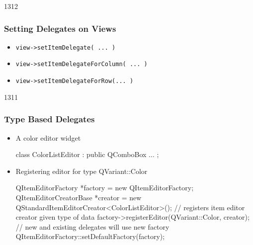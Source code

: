 \begin{slide}{1312}
  \frametitle{Setting Delegates on Views}
  \begin{itemize}
  \item \texttt{view->setItemDelegate( ... )}
  \item \texttt{view->setItemDelegateForColumn( ... )}
  \item \texttt{view->setItemDelegateForRow(... )}
 \end{itemize}
\end{slide}

\begin{slide}[fragile]{1311}
  \frametitle{Type Based Delegates}
\begin{itemize}
\item A color editor widget
\begin{cpp}
class ColorListEditor : public QComboBox {
 ...
}; 
\end{cpp}
\medskip
\item Registering editor for type QVariant::Color
\begin{cpp}
QItemEditorFactory *factory = new QItemEditorFactory;
QItemEditorCreatorBase *creator = 
        new QStandardItemEditorCreator<ColorListEditor>();
// registers item editor creator given type of data
factory->registerEditor(QVariant::Color, creator);
// new and existing delegates will use new factory
QItemEditorFactory::setDefaultFactory(factory);
\end{cpp}
\end{itemize}
\end{slide}


